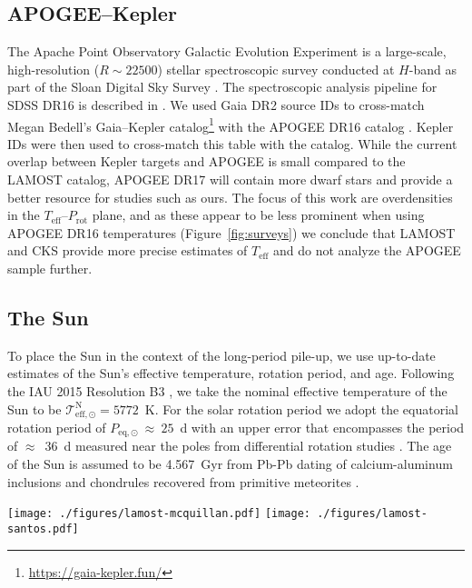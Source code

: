 \documentclass[linenumbers,tighten,trackchanges,twocolumn]{aastex631}
\newcommand{\teff}{\ensuremath{T_{\mathrm{eff}}}\xspace}
\newcommand{\prot}{\ensuremath{P_\mathrm{rot}}\xspace}
\begin{document}
\subsection{APOGEE--Kepler}
The Apache Point Observatory Galactic Evolution Experiment \citep[APOGEE;][]{Majewski2017} is a large-scale, high-resolution ($R \sim 22500$) stellar spectroscopic survey conducted at $H$-band as part of the Sloan Digital Sky Survey \citep[SDSS-IV;][]{Blanton2017}. The spectroscopic analysis pipeline for SDSS DR16 is described in \citet{Jonsson2020}. We used Gaia DR2 source IDs \citep{Gaia2016, Gaia2018} to cross-match Megan Bedell's Gaia--Kepler catalog\footnote{\url{https://gaia-kepler.fun/}} with the APOGEE DR16 catalog \citep{Ahumada2020}. Kepler IDs were then used to cross-match this table with the \citet{McQuillan2014} catalog. While the current overlap between Kepler targets and APOGEE is small compared to the LAMOST catalog, APOGEE DR17 will contain more dwarf stars and provide a better resource for studies such as ours. The focus of this work are overdensities in the \teff--\prot plane, and as these appear to be less prominent when using  APOGEE DR16 temperatures (Figure~\ref{fig:surveys}) we conclude that LAMOST and CKS provide more precise estimates of \teff and do not analyze the APOGEE sample further. 

\subsection{The Sun}
To place the Sun in the context of the long-period pile-up, we use up-to-date estimates of the Sun's effective temperature, rotation period, and age. Following the IAU 2015 Resolution B3 \citep{Prsa2016}, we take the nominal effective temperature of the Sun to be $\mathcal{T}^\mathrm{N}_\mathrm{eff,\odot} = 5772$~K. For the solar rotation period we adopt the equatorial rotation period of $P_\mathrm{eq,\odot}~\approx~25$~d with an upper error that encompasses the period of $\approx$~36~d measured near the poles from differential rotation studies \citep[][and references therein]{Thompson2003}.  The age of the Sun is assumed to be 4.567~Gyr from Pb-Pb dating of calcium-aluminum inclusions and chondrules recovered from primitive meteorites \citep[][and references therein]{Bahcall1995}.


\begin{figure*}
    \centering
    \texttt{[image: ./figures/lamost-mcquillan.pdf]}
    \texttt{[image: ./figures/lamost-santos.pdf]}
    \caption{}
    \label{fig:xmatch}
\end{figure*}
\end{document}
